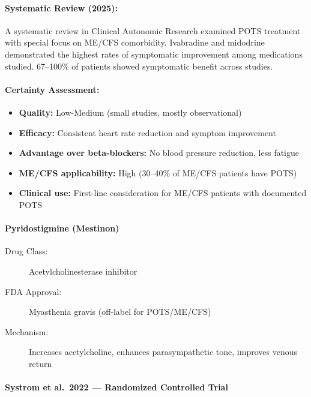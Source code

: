 \paragraph{Systematic Review (2025):}
A systematic review in Clinical Autonomic Research examined POTS treatment with special focus on ME/CFS comorbidity. Ivabradine and midodrine demonstrated the highest rates of symptomatic improvement among medications studied. 67--100\% of patients showed symptomatic benefit across studies.

\paragraph{Certainty Assessment:}
\begin{itemize}
    \item \textbf{Quality:} Low-Medium (small studies, mostly observational)
    \item \textbf{Efficacy:} Consistent heart rate reduction and symptom improvement
    \item \textbf{Advantage over beta-blockers:} No blood pressure reduction, less fatigue
    \item \textbf{ME/CFS applicability:} High (30--40\% of ME/CFS patients have POTS)
    \item \textbf{Clinical use:} First-line consideration for ME/CFS patients with documented POTS
\end{itemize}

\paragraph{Pyridostigmine (Mestinon)}

\begin{description}
    \item[Drug Class:] Acetylcholinesterase inhibitor
    \item[FDA Approval:] Myasthenia gravis (off-label for POTS/ME/CFS)
    \item[Mechanism:] Increases acetylcholine, enhances parasympathetic tone, improves venous return
\end{description}

\paragraph{Systrom et al.\ 2022 --- Randomized Controlled Trial}

